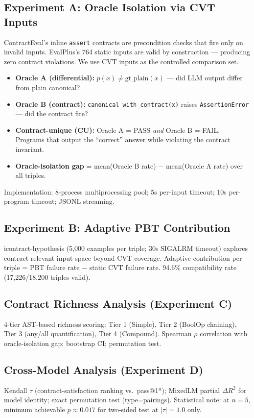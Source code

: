 \subsection{Experiment A: Oracle Isolation via CVT Inputs}

ContractEval's inline \texttt{assert} contracts are precondition checks that fire only on invalid inputs. EvalPlus's 764 static inputs are valid by construction --- producing zero contract violations. We use CVT inputs as the controlled comparison set.

\begin{itemize}
\item \textbf{Oracle A (differential):} $p(x) \neq \mathrm{gt\_plain}(x)$ --- did LLM output differ from plain canonical?
\item \textbf{Oracle B (contract):} \texttt{canonical\_with\_contract(x)} raises \texttt{AssertionError} --- did the contract fire?
\item \textbf{Contract-unique (CU):} Oracle A = PASS \emph{and} Oracle B = FAIL. Programs that output the ``correct'' answer while violating the contract invariant.
\item \textbf{Oracle-isolation gap} = mean(Oracle B rate) $-$ mean(Oracle A rate) over all triples.
\end{itemize}

Implementation: 8-process multiprocessing pool; 5s per-input timeout; 10s per-program timeout; JSONL streaming.

\subsection{Experiment B: Adaptive PBT Contribution}

icontract-hypothesis (5,000 examples per triple; 30s SIGALRM timeout) explores contract-relevant input space beyond CVT coverage. Adaptive contribution per triple = PBT failure rate $-$ static CVT failure rate. 94.6\% compatibility rate (17,226/18,200 triples valid).

\subsection{Contract Richness Analysis (Experiment C)}

4-tier AST-based richness scoring: Tier 1 (Simple), Tier 2 (BoolOp chaining), Tier 3 (any/all quantification), Tier 4 (Compound). Spearman $\rho$ correlation with oracle-isolation gap; bootstrap CI; permutation test.

\subsection{Cross-Model Analysis (Experiment D)}

Kendall $\tau$ (contract-satisfaction ranking vs.\ pass@1*); MixedLM partial $\Delta R^2$ for model identity; exact permutation test (type=pairings). Statistical note: at $n=5$, minimum achievable $p \approx 0.017$ for two-sided test at $|\tau|=1.0$ only.
